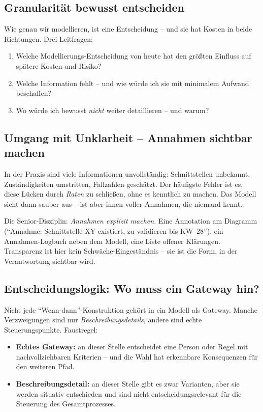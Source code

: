 \documentclass[11pt,a4paper,oneside]{article}
\begin{document}
\subsection{Granularität bewusst entscheiden}

Wie genau wir modellieren, ist eine Entscheidung -- und sie hat Kosten in beide Richtungen. Drei Leitfragen:

\begin{enumerate}
  \item Welche Modellierungs-Entscheidung von heute hat den größten Einfluss auf spätere Kosten und Risiko?
  \item Welche Information fehlt -- und wie würde ich sie mit minimalem Aufwand beschaffen?
  \item Wo würde ich bewusst \emph{nicht} weiter detaillieren -- und warum?
\end{enumerate}

\subsection{Umgang mit Unklarheit -- Annahmen sichtbar machen}

In der Praxis sind viele Informationen unvollständig: Schnittstellen unbekannt, Zuständigkeiten umstritten, Fallzahlen geschätzt. Der häufigste Fehler ist es, diese Lücken durch \emph{Raten} zu schließen, ohne es kenntlich zu machen. Das Modell sieht dann sauber aus -- ist aber innen voller Annahmen, die niemand kennt.

Die Senior-Disziplin: \emph{Annahmen explizit machen.} Eine Annotation am Diagramm (``Annahme: Schnittstelle XY existiert, zu validieren bis KW~28''), ein Annahmen-Logbuch neben dem Modell, eine Liste offener Klärungen. Transparenz ist hier kein Schwäche-Eingeständnis -- sie ist die Form, in der Verantwortung sichtbar wird.

\subsection{Entscheidungslogik: Wo muss ein Gateway hin?}

Nicht jede ``Wenn-dann''-Konstruktion gehört in ein Modell als Gateway. Manche Verzweigungen sind nur \emph{Beschreibungsdetails}, andere sind echte Steuerungspunkte. Faustregel:

\begin{itemize}
  \item \textbf{Echtes Gateway:} an dieser Stelle entscheidet eine Person oder Regel mit nachvollziehbaren Kriterien -- und die Wahl hat erkennbare Konsequenzen für den weiteren Pfad.
  \item \textbf{Beschreibungsdetail:} an dieser Stelle gibt es zwar Varianten, aber sie werden situativ entschieden und sind nicht entscheidungsrelevant für die Steuerung des Gesamtprozesses.
\end{itemize}
\end{document}
